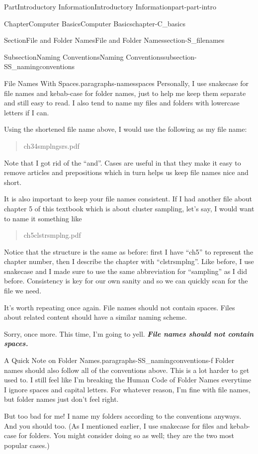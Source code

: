 \documentclass[oneside,10pt,]{book}
\newcommand{\alert}[1]{\textbf{\textit{#1}}}
\begin{document}
\begin{partptx}{Part}{Introductory Information}{}{Introductory Information}{}{}{part-part-intro}
\begin{chapterptx}{Chapter}{Computer Basics}{}{Computer Basics}{}{}{chapter-C_basics}
\begin{sectionptx}{Section}{File and Folder Names}{}{File and Folder Names}{}{}{section-S_filenames}
\begin{subsectionptx}{Subsection}{Naming Conventions}{}{Naming Conventions}{}{}{subsection-SS_namingconventions}
\begin{paragraphs}{File Names With Spaces.}{paragraphs-namesspaces}
Personally, I use snake\textunderscore{}case for file names and kebab-case for folder names, just to help me keep them separate and still easy to read. I also tend to name my files and folders with lowercase letters if I can.%
\par
Using the shortened file name above, I would use the following as my file name:%
\begin{quote}%
ch3\textunderscore{}4\textunderscore{}smplng\textunderscore{}srs.pdf%
\end{quote}
Note that I got rid of the ``and''. Cases are useful in that they make it easy to remove articles and prepositions which in turn helps us keep file names nice and short.%
\par
It is also important to keep your file names consistent. If I had another file about chapter 5 of this textbook which is about cluster sampling, let's say, I would want to name it something like%
\begin{quote}%
ch5\textunderscore{}clstr\textunderscore{}smplng.pdf%
\end{quote}
Notice that the structure is the same as before: first I have ``ch5'' to represent the chapter number, then I describe the chapter with ``clstr\textunderscore{}smplng''. Like before, I use snake\textunderscore{}case and I made sure to use the same abbreviation for ``sampling'' as I did before. Consistency is key for our own sanity and so we can quickly scan for the file we need.%
\par
It's worth repeating once again. File names should not contain spaces. Files about related content should have a similar naming scheme.%
\par
Sorry, once more. This time, I'm going to yell. \alert{File names should not contain spaces.}%
\end{paragraphs}%
\begin{paragraphs}{A Quick Note on Folder Names.}{paragraphs-SS_namingconventions-f}%
%
%
Folder names should also follow all of the conventions above. This is a lot harder to get used to. I still feel like I'm breaking the Human Code of Folder Names everytime I ignore spaces and capital letters. For whatever reason, I'm fine with file names, but folder names just don't feel right.%
\par
But too bad for me! I name my folders according to the conventions anyways. And you should too. (As I mentioned earlier, I use snake\textunderscore{}case for files and kebab-case for folders. You might consider doing so as well; they are the two most popular cases.)%

\end{paragraphs}
\end{subsectionptx}
\end{sectionptx}
\end{chapterptx}
\end{partptx}
\end{document}
